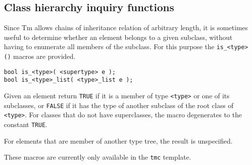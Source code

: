 \subsection{Class hierarchy inquiry functions}
Since Tm allows chains of inheritance relation of arbitrary length, it
is sometimes useful to determine whether an element belongs to a given
subclass, without having to enumerate all members of the subclass.
For this purpose the \verb'is_<type>()' macros are provided.
\begin{verbatim}
bool is_<type>( <supertype> e );
bool is_<type>_list( <type>_list e );
\end{verbatim}
\begin{desc}
Given an element return \verb'TRUE' if it is a member of type
\verb'<type>' or one of its subclasses, or \verb'FALSE' if it has
the type of another subclass of the root class of \verb'<type>'.
For classes that do not have superclasses, the macro degenerates to
the constant \verb'TRUE'.
\par
For elements that are member of another type tree, the result is
unspecified.
\par
These macros are currently only available in the \verb'tmc' template.
\end{desc}
